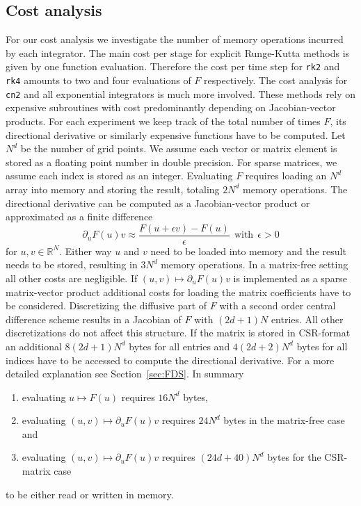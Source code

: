 \documentclass{scrartcl}
\begin{document}
\subsection{Cost analysis}
	For our cost analysis we investigate the number of memory operations incurred by each integrator. The main cost per stage for explicit Runge-Kutta methods is given by one function evaluation. Therefore the cost per time step for \texttt{rk2} and \texttt{rk4} amounts to two and four evaluations of $F$ respectively. The cost analysis for \texttt{cn2} and all exponential integrators is much more involved. These methods rely on expensive subroutines with cost predominantly depending on Jacobian-vector products. For each experiment we keep track of the total number of times $F$, its directional derivative or similarly expensive functions have to be computed.
	Let $N^d$ be the number of grid points. We assume each vector or matrix element is stored as a floating point number in double precision. For sparse matrices, we assume each index is stored as an integer. Evaluating $F$ requires loading an $N^d$ array into memory and storing the result, totaling $2N^d$ memory operations. The directional derivative can be computed as a Jacobian-vector product or approximated as a finite difference 
	\[
	\partial_u F(u)v \approx \frac{F(u+\epsilon v)-F(u)}{\epsilon} ~~\text{with}~~ \epsilon > 0
	\]
	for $u, v\in\mathbb{R}^{N}$.
	Either way $u$ and $v$ need to be loaded into memory and the result needs to be stored, resulting in $3N^d$ memory operations. In a matrix-free setting all other costs are negligible. If $(u,v)\mapsto \partial_u F(u)v$ is implemented as a sparse matrix-vector product additional costs for loading the matrix coefficients have to be considered. Discretizing the diffusive part of $F$ with a second order central difference scheme results in a Jacobian of $F$ with $(2d+1)N$ entries. All other discretizations do not affect this structure. If the matrix is stored in CSR-format an additional $8(2d+1)N^d$ bytes for all entries and $4(2d+2)N^d$ bytes for all indices have to be accessed to compute the directional derivative. For a more detailed explanation see Section~\ref{sec:FDS}.
	In summary
	\begin{enumerate}
		\item evaluating $u \mapsto F(u)$ requires $16N^d$ bytes,
		\item evaluating $(u,v) \mapsto \partial_u F(u)v$ requires $24N^d$ bytes in the matrix-free case and
		\item evaluating $(u,v) \mapsto \partial_u F(u)v$ requires $(24d+40)N^d$ bytes for the CSR-matrix case
	\end{enumerate}
	to be either read or written in memory. 
	
\end{document}
